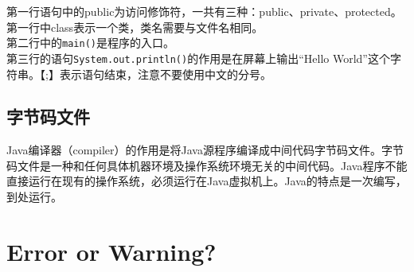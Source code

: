 第一行语句中的public为访问修饰符，一共有三种：public、private、protected。第一行中class表示一个类，类名需要与文件名相同。 \\

第二行中的\lstinline|main()|是程序的入口。 \\

第三行的语句\lstinline|System.out.println()|的作用是在屏幕上输出“Hello World”这个字符串。【;】表示语句结束，注意不要使用中文的分号。

\subsection{字节码文件}

Java编译器（compiler）的作用是将Java源程序编译成中间代码字节码文件。字节码文件是一种和任何具体机器环境及操作系统环境无关的中间代码。Java程序不能直接运行在现有的操作系统，必须运行在Java虚拟机上。Java的特点是一次编写，到处运行。

\newpage

\section{Error or Warning?}

